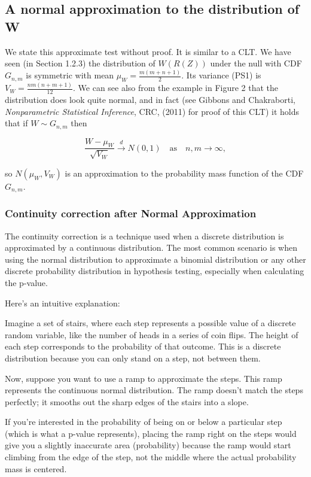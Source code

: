 \documentclass{article}
\begin{document}
\subsection{A normal approximation to the distribution of W}

We state this approximate test without proof. It is similar to a CLT. We have seen (in Section 1.2.3)
the distribution of \(W(R(Z))\) under the null with CDF \(G_{n,m}\) is symmetric with mean \(\mu_W = \frac{m(m+n+1)}{2}\). Its variance (PS1) is \(V_W = \frac{nm(n+m+1)}{12}\). We can see also from the example in
Figure 2 that the distribution does look quite normal, and in fact (see Gibbons and Chakraborti,
\textit{Nonparametric Statistical Inference}, CRC, (2011) for proof of this CLT) it holds that if \(W \sim G_{n,m}\) then

$$
\frac{W - \mu_W}{\sqrt{V_W}} \xrightarrow{d} N(0,1) \quad \text{as} \quad n,m \rightarrow \infty,
$$

so \(N(\mu_W, V_W)\) is an approximation to the probability mass function of the CDF \(G_{n,m}\).

\subsubsection{Continuity correction after Normal Approximation}
The continuity correction is a technique used when a discrete distribution is approximated by a continuous distribution. The most common scenario is when using the normal distribution to approximate a binomial distribution or any other discrete probability distribution in hypothesis testing, especially when calculating the p-value.

Here's an intuitive explanation:

Imagine a set of stairs, where each step represents a possible value of a discrete random variable, like the number of heads in a series of coin flips. The height of each step corresponds to the probability of that outcome. This is a discrete distribution because you can only stand on a step, not between them.

Now, suppose you want to use a ramp to approximate the steps. This ramp represents the continuous normal distribution. The ramp doesn't match the steps perfectly; it smooths out the sharp edges of the stairs into a slope.

If you're interested in the probability of being on or below a particular step (which is what a p-value represents), placing the ramp right on the steps would give you a slightly inaccurate area (probability) because the ramp would start climbing from the edge of the step, not the middle where the actual probability mass is centered.
\end{document}
